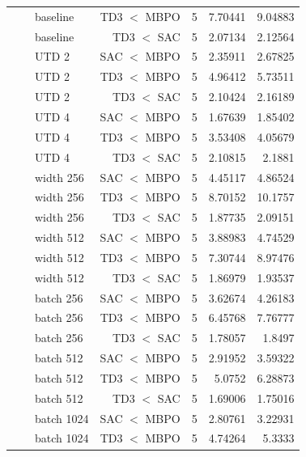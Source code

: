 {\begin{longtable}{@{}lllrrrr@{}}
     &  & baseline & TD3 $<$ MBPO & \num{5} & \num{7.70441} & \num{9.04883} \\
     &  & baseline & TD3 $<$ SAC & \num{5} & \num{2.07134} & \num{2.12564} \\
     &  & UTD 2 & SAC $<$ MBPO & \num{5} & \num{2.35911} & \num{2.67825} \\
     &  & UTD 2 & TD3 $<$ MBPO & \num{5} & \num{4.96412} & \num{5.73511} \\
     &  & UTD 2 & TD3 $<$ SAC & \num{5} & \num{2.10424} & \num{2.16189} \\
     &  & UTD 4 & SAC $<$ MBPO & \num{5} & \num{1.67639} & \num{1.85402} \\
     &  & UTD 4 & TD3 $<$ MBPO & \num{5} & \num{3.53408} & \num{4.05679} \\
     &  & UTD 4 & TD3 $<$ SAC & \num{5} & \num{2.10815} & \num{2.1881} \\
     &  & width 256 & SAC $<$ MBPO & \num{5} & \num{4.45117} & \num{4.86524} \\
     &  & width 256 & TD3 $<$ MBPO & \num{5} & \num{8.70152} & \num{10.1757} \\
     &  & width 256 & TD3 $<$ SAC & \num{5} & \num{1.87735} & \num{2.09151} \\
     &  & width 512 & SAC $<$ MBPO & \num{5} & \num{3.88983} & \num{4.74529} \\
     &  & width 512 & TD3 $<$ MBPO & \num{5} & \num{7.30744} & \num{8.97476} \\
     &  & width 512 & TD3 $<$ SAC & \num{5} & \num{1.86979} & \num{1.93537} \\
     &  & batch 256 & SAC $<$ MBPO & \num{5} & \num{3.62674} & \num{4.26183} \\
     &  & batch 256 & TD3 $<$ MBPO & \num{5} & \num{6.45768} & \num{7.76777} \\
     &  & batch 256 & TD3 $<$ SAC & \num{5} & \num{1.78057} & \num{1.8497} \\
     &  & batch 512 & SAC $<$ MBPO & \num{5} & \num{2.91952} & \num{3.59322} \\
     &  & batch 512 & TD3 $<$ MBPO & \num{5} & \num{5.0752} & \num{6.28873} \\
     &  & batch 512 & TD3 $<$ SAC & \num{5} & \num{1.69006} & \num{1.75016} \\
     &  & batch 1024 & SAC $<$ MBPO & \num{5} & \num{2.80761} & \num{3.22931} \\
     &  & batch 1024 & TD3 $<$ MBPO & \num{5} & \num{4.74264} & \num{5.3333} \\

\end{longtable}}
